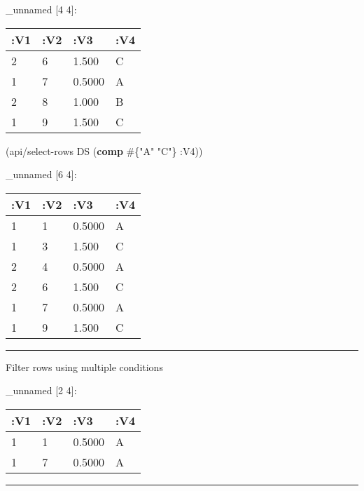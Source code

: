 \documentclass[]{article}
\newenvironment{Shaded}{\begin{snugshade}}{\end{snugshade}}
\newcommand{\KeywordTok}[1]{\textcolor[rgb]{0.13,0.29,0.53}{\textbf{#1}}}
\newcommand{\DecValTok}[1]{\textcolor[rgb]{0.00,0.00,0.81}{#1}}
\newcommand{\StringTok}[1]{\textcolor[rgb]{0.31,0.60,0.02}{#1}}
\newcommand{\VariableTok}[1]{\textcolor[rgb]{0.00,0.00,0.00}{#1}}
\newcommand{\AttributeTok}[1]{\textcolor[rgb]{0.77,0.63,0.00}{#1}}
\newcommand{\NormalTok}[1]{#1}
\begin{document}
\_unnamed {[}4 4{]}:

\begin{longtable}[]{@{}llll@{}}
\toprule
:V1 & :V2 & :V3 & :V4\tabularnewline
\midrule
\endhead
2 & 6 & 1.500 & C\tabularnewline
1 & 7 & 0.5000 & A\tabularnewline
2 & 8 & 1.000 & B\tabularnewline
1 & 9 & 1.500 & C\tabularnewline
\bottomrule
\end{longtable}

\begin{Shaded}
\begin{Highlighting}[]
\NormalTok{(api/select-rows DS (}\KeywordTok{comp}\NormalTok{ #\{}\StringTok{"A"} \StringTok{"C"}\NormalTok{\} }\AttributeTok{:V4}\NormalTok{))}
\end{Highlighting}
\end{Shaded}

\_unnamed {[}6 4{]}:

\begin{longtable}[]{@{}llll@{}}
\toprule
:V1 & :V2 & :V3 & :V4\tabularnewline
\midrule
\endhead
1 & 1 & 0.5000 & A\tabularnewline
1 & 3 & 1.500 & C\tabularnewline
2 & 4 & 0.5000 & A\tabularnewline
2 & 6 & 1.500 & C\tabularnewline
1 & 7 & 0.5000 & A\tabularnewline
1 & 9 & 1.500 & C\tabularnewline
\bottomrule
\end{longtable}

\begin{center}\rule{0.5\linewidth}{0.5pt}\end{center}

Filter rows using multiple conditions

\begin{Shaded}
\end{Shaded}

\_unnamed {[}2 4{]}:

\begin{longtable}[]{@{}llll@{}}
\toprule
:V1 & :V2 & :V3 & :V4\tabularnewline
\midrule
\endhead
1 & 1 & 0.5000 & A\tabularnewline
1 & 7 & 0.5000 & A\tabularnewline
\bottomrule
\end{longtable}

\begin{center}\rule{0.5\linewidth}{0.5pt}\end{center}
\end{document}
